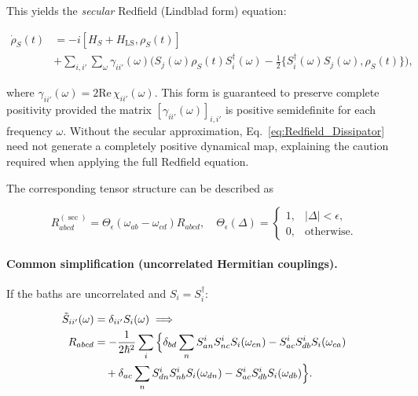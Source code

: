 This yields the \emph{secular} Redfield (Lindblad form) equation:

\begin{align}
	\dot{\rho}_S(t) & = -i [H_S + H_{\text{LS}}, \rho_S(t)]                                                                                                                                     \\
	                & + \sum_{i,i'} \sum_{\omega} \gamma_{ii'}(\omega) \Big( S_j(\omega) \rho_S(t) S_i^{\dagger}(\omega) - \tfrac{1}{2} \{ S_i^{\dagger}(\omega) S_j(\omega), \rho_S(t) \} \Big),
	\label{eq:Secular_Lindblad_Form}
\end{align}

\noindent
where $\gamma_{ii'}(\omega) = 2 \mathrm{Re}\,\chi_{ii'}(\omega)$. This form is guaranteed to preserve complete positivity provided the matrix $[\gamma_{ii'}(\omega)]_{i,i'}$ is positive semidefinite for each frequency $\omega$. Without the secular approximation, Eq.~\eqref{eq:Redfield_Dissipator} need not generate a completely positive dynamical map, explaining the caution required when applying the full Redfield equation.

\noindent
The corresponding tensor structure can be described as 

\begin{equation}
R_{abcd}^{(\sec)} = \Theta_\epsilon(\omega_{ab} - \omega_{cd}) R_{abcd}, \quad \Theta_\epsilon(\Delta) = \begin{cases} 1, & |\Delta| < \epsilon, \\ 0, & \text{otherwise}. \end{cases}
\end{equation}


\paragraph{Common simplification (uncorrelated Hermitian couplings).}

\noindent
If the baths are uncorrelated and $S_i=S_i^\dagger$:

\begin{align}
\tilde{S}_{ii'}(\omega) &= \delta_{ii'} S_i(\omega) \implies \notag \\
R_{abcd} &= -\frac{1}{2\hbar^{2}} \sum_{i} \Big\{
\delta_{bd} \sum_n S^{i}_{an} S^{i}_{nc} S_{i}(\omega_{cn})
- S^{i}_{ac} S^{i}_{db} S_{i}(\omega_{ca}) \notag \\
&\quad + \delta_{ac} \sum_n S^{i}_{dn} S^{i}_{nb} S_{i}(\omega_{dn})
- S^{i}_{ac} S^{i}_{db} S_{i}(\omega_{db})
\Big\}.
\label{eq:Rabcd_uncor}
\end{align}


